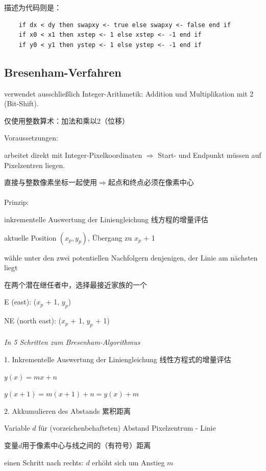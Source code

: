 \documentclass[fleqn]{article}
\begin{document}
描述为代码则是：

\begin{lstlisting}
    if dx < dy then swapxy <- true else swapxy <- false end if
    if x0 < x1 then xstep <- 1 else xstep <- -1 end if
    if y0 < y1 then ystep <- 1 else ystep <- -1 end if
\end{lstlisting}

\subsection{Bresenham-Verfahren}

verwendet ausschließlich Integer-Arithmetik: Addition und Multiplikation mit 2 (Bit-Shift). 

仅使用整数算术：加法和乘以2（位移）

\noindent Voraussetzungen: 

arbeitet direkt mit Integer-Pixelkoordinaten $\Rightarrow$ Start- und Endpunkt müssen auf Pixelzentren liegen.

直接与整数像素坐标一起使用$\Rightarrow$起点和终点必须在像素中心
\\
\\
\noindent Prinzip:

inkrementelle Auswertung der Liniengleichung 线方程的增量评估

\indent\indent aktuelle Position $(x_p, y_p)$, Übergang zu $x_p$ + 1

wähle unter den zwei potentiellen Nachfolgern denjenigen, der Linie am nächsten liegt 

在两个潜在继任者中，选择最接近家族的一个

\indent\indent E (east): ($x_p$ + 1, $y_p$)

\indent\indent NE (north east): ($x_p$ + 1, $y_p$ + 1)
\\
\\
\noindent\textit{In 5 Schritten zum Bresenham-Algorithmus}

1. Inkrementelle Auswertung der Liniengleichung 线性方程式的增量评估

\indent\indent $y(x) = mx + n$

\indent\indent $y(x+1) = m(x+1) + n = y(x) + m$

2. Akkumulieren des Abstands 累积距离

\indent\indent Variable $d$ für (vorzeichenbehafteten) Abstand Pixelzentrum - Linie 

\indent\indent 变量$ d $用于像素中心与线之间的（有符号）距离

\indent\indent einen Schritt nach rechts: $d$ erhöht sich um Anstieg $m$ 
\end{document}
